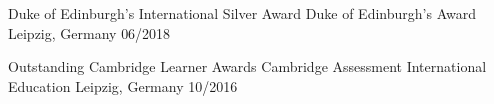 



\begin{cvhonors}

  \cvhonor
    {Duke of Edinburgh's International Silver Award} %
    {Duke of Edinburgh's Award} %
    {Leipzig, Germany} %
    {06/2018} %

  \cvhonor
    {Outstanding Cambridge Learner Awards} %
    {Cambridge Assessment International Education} %
    {Leipzig, Germany} %
    {10/2016} %

\end{cvhonors}